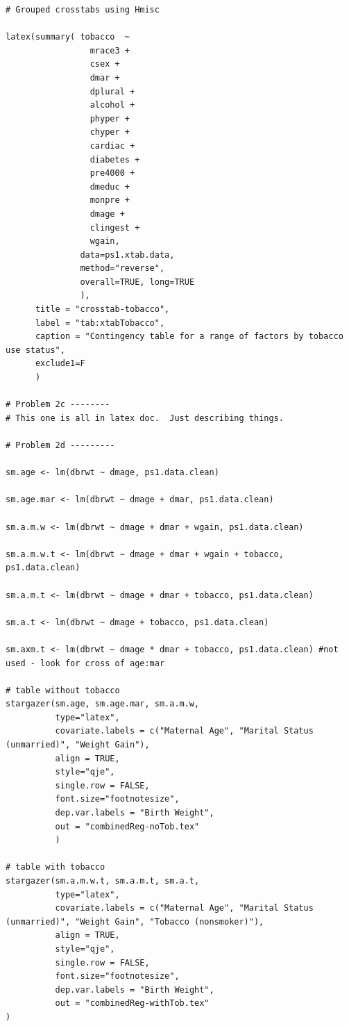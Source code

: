 \documentclass[a4paper, 12pt]{article}
\begin{document}
\begin{verbatim}
# Grouped crosstabs using Hmisc

latex(summary( tobacco  ~ 
                 mrace3 + 
                 csex + 
                 dmar +
                 dplural + 
                 alcohol + 
                 phyper + 
                 chyper +
                 cardiac +
                 diabetes +
                 pre4000 +
                 dmeduc +
                 monpre +
                 dmage +
                 clingest + 
                 wgain, 
               data=ps1.xtab.data,  
               method="reverse", 
               overall=TRUE, long=TRUE
               ),
      title = "crosstab-tobacco",
      label = "tab:xtabTobacco",
      caption = "Contingency table for a range of factors by tobacco use status",
      exclude1=F
      )

# Problem 2c --------
# This one is all in latex doc.  Just describing things.

# Problem 2d ---------

sm.age <- lm(dbrwt ~ dmage, ps1.data.clean)

sm.age.mar <- lm(dbrwt ~ dmage + dmar, ps1.data.clean)

sm.a.m.w <- lm(dbrwt ~ dmage + dmar + wgain, ps1.data.clean)

sm.a.m.w.t <- lm(dbrwt ~ dmage + dmar + wgain + tobacco, ps1.data.clean)

sm.a.m.t <- lm(dbrwt ~ dmage + dmar + tobacco, ps1.data.clean)

sm.a.t <- lm(dbrwt ~ dmage + tobacco, ps1.data.clean)

sm.axm.t <- lm(dbrwt ~ dmage * dmar + tobacco, ps1.data.clean) #not used - look for cross of age:mar

# table without tobacco
stargazer(sm.age, sm.age.mar, sm.a.m.w, 
          type="latex",
          covariate.labels = c("Maternal Age", "Marital Status (unmarried)", "Weight Gain"),
          align = TRUE,
          style="qje", 
          single.row = FALSE,
          font.size="footnotesize",
          dep.var.labels = "Birth Weight",
          out = "combinedReg-noTob.tex"
          )

# table with tobacco
stargazer(sm.a.m.w.t, sm.a.m.t, sm.a.t, 
          type="latex",
          covariate.labels = c("Maternal Age", "Marital Status (unmarried)", "Weight Gain", "Tobacco (nonsmoker)"),
          align = TRUE,
          style="qje", 
          single.row = FALSE,
          font.size="footnotesize",
          dep.var.labels = "Birth Weight",
          out = "combinedReg-withTob.tex"
)




\end{verbatim}
\end{document}
